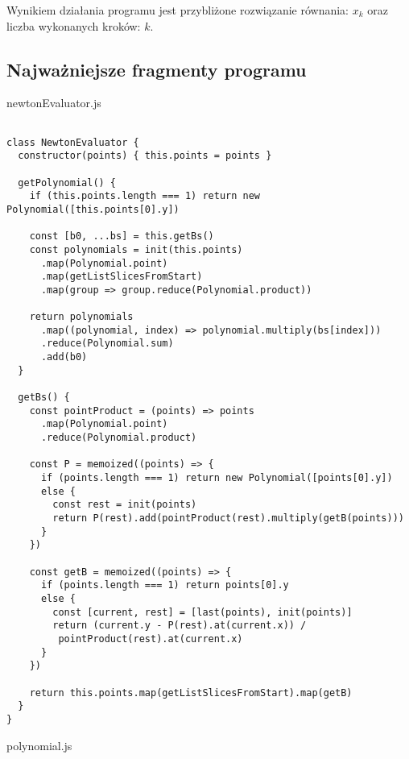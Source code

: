 \documentclass[12pt]{article}
\begin{document}
Wynikiem działania programu jest przybliżone rozwiązanie równania: $x_k$ oraz liczba wykonanych kroków: $k$.
\newpage
\subsection{Najważniejsze fragmenty programu}
newtonEvaluator.js
\begin{verbatim}

class NewtonEvaluator {
  constructor(points) { this.points = points }

  getPolynomial() {
    if (this.points.length === 1) return new Polynomial([this.points[0].y])

    const [b0, ...bs] = this.getBs()
    const polynomials = init(this.points)
      .map(Polynomial.point)
      .map(getListSlicesFromStart)
      .map(group => group.reduce(Polynomial.product))

    return polynomials
      .map((polynomial, index) => polynomial.multiply(bs[index]))
      .reduce(Polynomial.sum)
      .add(b0)
  }

  getBs() {
    const pointProduct = (points) => points
      .map(Polynomial.point)
      .reduce(Polynomial.product)

    const P = memoized((points) => {
      if (points.length === 1) return new Polynomial([points[0].y])
      else {
        const rest = init(points)
        return P(rest).add(pointProduct(rest).multiply(getB(points)))
      }
    })

    const getB = memoized((points) => {
      if (points.length === 1) return points[0].y
      else {
        const [current, rest] = [last(points), init(points)]
        return (current.y - P(rest).at(current.x)) /
         pointProduct(rest).at(current.x)
      }
    })

    return this.points.map(getListSlicesFromStart).map(getB)
  }
}

\end{verbatim}
polynomial.js
\end{document}
